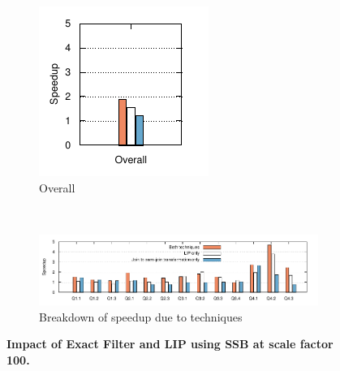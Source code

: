 
\begin{figure}[bht]
	\centering 
	\begin{subfigure}[ht]{0.2\textwidth}
		\includegraphics[width=\textwidth]{system/figures/lip-ef-impact-total}
		\caption{Overall}
	\end{subfigure}
	~
	\begin{subfigure}[ht]{0.7\textwidth}
		\includegraphics[width=\textwidth]{system/figures/lip-ef-impact}
		\caption{Breakdown of speedup due to techniques}
	\end{subfigure}
	\caption{\textbf{Impact of Exact Filter and LIP using SSB at scale factor 100.}}
	\label{fig-lip-ef-impact}
\end{figure}

